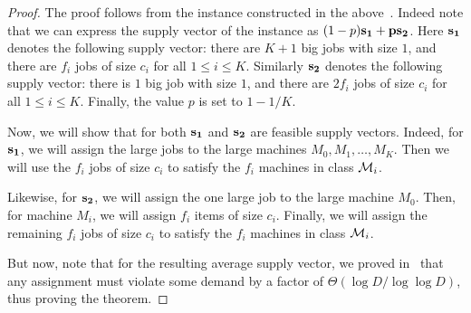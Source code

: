 \begin{proof}
The proof follows from the instance constructed in the above~. Indeed note that we can express the supply vector of the instance as $(1-p) \bf{s}_1 + p \bf{s}_2$. Here $\bf{s}_1$ denotes the following supply vector: there are $K+1$ big jobs with size $1$, and there are $f_i$ jobs of size $c_i$ for all $1 \leq i \leq K$. Similarly $\bf{s}_2$ denotes the following supply vector: there is $1$ big job with size $1$, and there are $2f_i$ jobs of size $c_i$ for all $1 \leq i \leq K$. Finally, the value $p$ is set to $1-1/K$. 

Now, we will show that for both $\bf{s}_1$ and $\bf{s}_2$ are feasible supply vectors. Indeed, for $\bf{s}_1$, we will assign the large jobs to the large machines $M_0, M_1, \ldots, M_K$. Then we will use the $f_i$ jobs of size $c_i$ to satisfy the $f_i$ machines in class ${\cal M}_i$. 

Likewise, for $\bf{s}_2$, we will assign the one large job to the large machine $M_0$. Then, for machine $M_i$, we will assign $f_i$ items of size $c_i$. Finally, we will assign the remaining $f_i$ jobs of size $c_i$ to satisfy the $f_i$ machines in class ${\cal M}_i$.

But now, note that for the resulting average supply vector, we proved in~ that any assignment must violate some demand by a factor of $\Theta(\log D/\log \log D)$, thus proving the theorem.
\end{proof}
